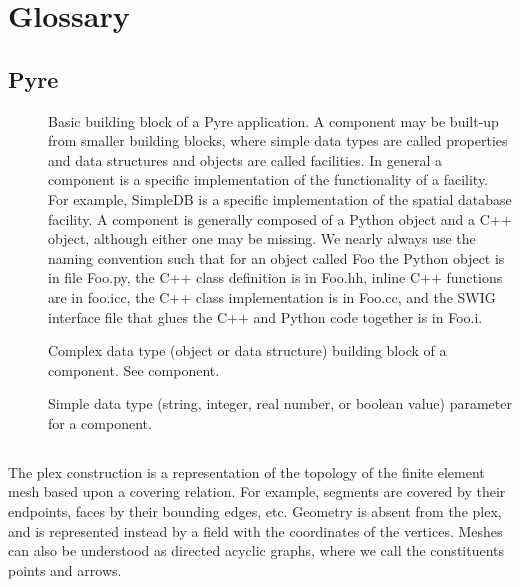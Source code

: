 \chapter{Glossary}
\label{cha:glossary}

\section{Pyre}
\begin{description}
\item [] Basic building block of a Pyre
  application. A component may be built-up from smaller building
  blocks, where simple data types are called properties and data
  structures and objects are called facilities.  In general a
  component is a specific implementation of the functionality of a
  facility. For example, SimpleDB is a specific implementation of the
  spatial database facility. A component is generally composed of a
  Python object and a C++ object, although either one may be missing.
  We nearly always use the naming convention such that for an object
  called Foo the Python object is in file Foo.py, the C++ class
  definition is in Foo.hh, inline C++ functions are in foo.icc, the
  C++ class implementation is in Foo.cc, and the SWIG interface file
  that glues the C++ and Python code together is in Foo.i.
\item [] Complex data type (object or data
  structure) building block of a component. See component.
\item [] Simple data type (string, integer, real
  number, or boolean value) parameter for a component.
\end{description}

\section{}

The plex construction is a representation of the topology of the
finite element mesh based upon a covering relation. For example,
segments are covered by their endpoints, faces by their bounding
edges, etc. Geometry is absent from the plex, and is represented
instead by a field with the coordinates of the vertices. Meshes can
also be understood as directed acyclic graphs, where we call the
constituents points and arrows.

